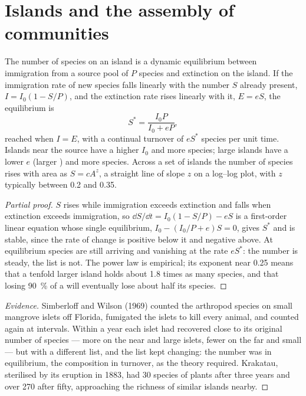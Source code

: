 \section{Islands and the assembly of communities}

\begin{theorem}\label{thm:b1:ecosystem-dynamics:island}
The number of species on an island is a dynamic equilibrium between
immigration from a source pool of $P$ species and extinction on the
island. If the immigration rate of new species falls linearly with
the number $S$ already present, $I = I_0(1 - S/P)$, and the extinction
rate rises linearly with it, $E = eS$, the equilibrium is
\[
S^* = \frac{I_0 P}{I_0 + eP} ,
\]
reached when $I = E$, with a continual turnover of $eS^*$ species per
unit time. Islands near the source have a higher $I_0$ and more
species; large islands have a lower $e$ (larger ) and more
species. Across a set of islands the number of species rises with area
as $S = cA^z$, a straight line of slope $z$ on a log--log plot, with
$z$ typically between \num{0.2} and \num{0.35}.
\end{theorem}
\begin{proof}[Partial proof]
$S$ rises while immigration exceeds extinction and falls when
extinction exceeds immigration, so $\dd S/\dd t = I_0(1 - S/P) - eS$
is a first-order linear equation whose single equilibrium, $I_0 -
(I_0/P + e)S = 0$, gives $S^*$ and is stable, since the rate of change
is positive below it and negative above. At equilibrium species are
still arriving and vanishing at the rate $eS^*$: the number is steady,
the list is not. The power law is empirical; its exponent near
\num{0.25} means that a tenfold larger island holds about \num{1.8}
times as many species, and that losing \qty{90}{\%} of a  will
eventually lose about half its species.
\end{proof}
\begin{proof}[Evidence]
Simberloff and Wilson (1969) counted the arthropod species on small
mangrove islets off Florida, fumigated the islets to kill every
animal, and counted again at intervals. Within a year each islet had
recovered close to its original number of species --- more on the
near and large islets, fewer on the far and small --- but with a
different list, and the list kept changing: the number was in
equilibrium, the composition in turnover, as the theory required.
Krakatau, sterilised by its eruption in 1883, had \num{30} species of
plants after three years and over \num{270} after fifty, approaching
the richness of similar islands nearby.
\end{proof}

